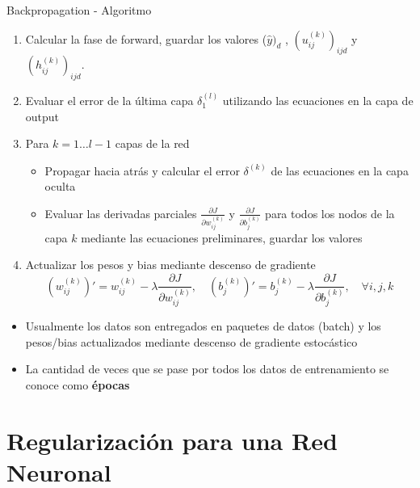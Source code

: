 \documentclass[9pt]{beamer}
\begin{document}
\begin{frame}{Backpropagation - Algoritmo}

\begin{enumerate}
  \item Calcular la fase de forward, guardar los valores ($\hat{y})_d$ , $(u_{ij}^{(k)})_{ijd}$ y $(h_{ij}^{(k)})_{ijd}$. \pause


  \item Evaluar el error de la última capa $\delta_1^{(l)}$  utilizando las ecuaciones en la capa de output \pause

  \item Para $k=1 \dots l-1$ capas de la red \pause

  \begin{itemize}
    \item Propagar hacia atrás y calcular el error $\delta^{(k)}$ de las ecuaciones en la capa oculta  \pause
    \item Evaluar las derivadas parciales $\frac{\partial J}{\partial w_{ij}^{(k)}}$ y $\frac{\partial J}{\partial b_j^{(k)}}$ para todos los nodos de la capa $k$ mediante las ecuaciones preliminares, guardar los valores \pause

  \end{itemize}

  \item Actualizar los pesos y bias mediante descenso de gradiente 
  \[
  (w_{ij}^{(k)})' = w_{ij}^{(k)} - \lambda \frac{\partial J}{\partial w_{ij}^{(k)}}, \quad (b_{j}^{(k)})' = b_{j}^{(k)} - \lambda \frac{\partial J}{\partial b_{j}^{(k)}}, \quad \forall i,j,k
  \]
  \pause
\end{enumerate}

\begin{observacion}

\begin{itemize}
  \item Usualmente los datos son entregados en paquetes de datos (batch) y los pesos/bias actualizados mediante descenso de gradiente estocástico
  \item La cantidad de veces que se pase por todos los datos de entrenamiento se conoce como \textbf{épocas}
\end{itemize}

\end{observacion}

\end{frame}

\section{Regularización para una Red Neuronal}
\end{document}
